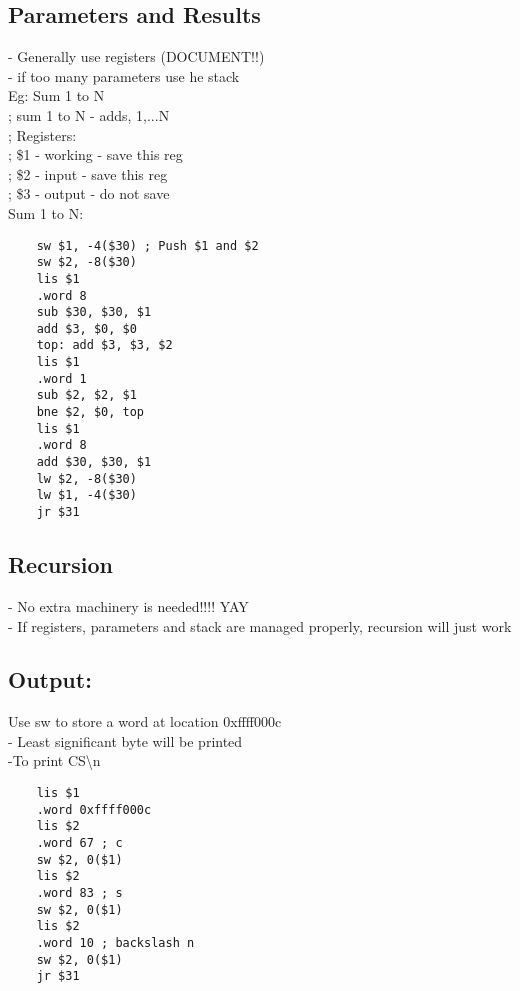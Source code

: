 \documentclass[12pt]{article}
\begin{document}
	\subsection*{Parameters and Results}
	- Generally use registers (DOCUMENT!!)\\
	- if too many parameters use he stack\\
	
	Eg: Sum 1 to N\\
	
	; sum 1 to N - adds, 1,...N\\
	; Registers: \\
	; \$1 - working - save this reg\\
	; \$2 - input - save this reg\\
	; \$3 - output - do not save\\
	
	Sum 1 to N:
	\begin{lstlisting}
	sw $1, -4($30) ; Push $1 and $2
	sw $2, -8($30) 
	lis $1
	.word 8
	sub $30, $30, $1
	add $3, $0, $0
	top: add $3, $3, $2
	lis $1
	.word 1
	sub $2, $2, $1
	bne $2, $0, top
	lis $1
	.word 8
	add $30, $30, $1
	lw $2, -8($30)
	lw $1, -4($30)
	jr $31
	\end{lstlisting}
	
	\subsection*{Recursion}
	- No extra machinery is needed!!!! YAY\\
	- If registers, parameters and stack are managed properly, recursion will just work\\
	
	\subsection*{Output:}
	Use sw to store a word at location 0xffff000c\\
	- Least significant byte will be printed\\
	-To print CS\textbackslash n
	\begin{lstlisting}
	lis $1
	.word 0xffff000c
	lis $2
	.word 67 ; c
	sw $2, 0($1)
	lis $2
	.word 83 ; s
	sw $2, 0($1)
	lis $2
	.word 10 ; backslash n
	sw $2, 0($1)
	jr $31
	\end{lstlisting}
	
	
\end{document}
